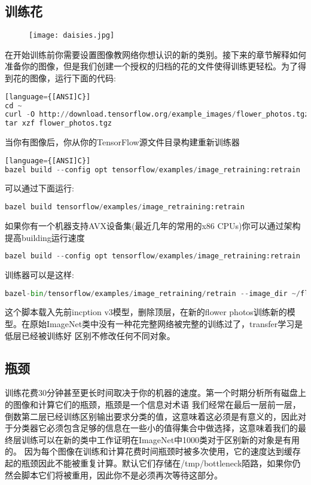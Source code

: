 \subsection{训练花}
\begin{center}
\begin{figure}
\texttt{[image: daisies.jpg]}
\end{figure}
\end{center}
在开始训练前你需要设置图像教网络你想认识的新的类别。接下来的章节解释如何准备你的图像，但是我们创建一个授权的归档的花的文件使得训练更轻松。为了得到花的图像，运行下面的代码:
\begin{lstlisting}[language=Python][language={[ANSI]C}]
cd ~
curl -O http://download.tensorflow.org/example_images/flower_photos.tgz
tar xzf flower_photos.tgz
\end{lstlisting}
当你有图像后，你从你的TensorFlow源文件目录构建重新训练器
\begin{lstlisting}[language=Python][language={[ANSI]C}]
bazel build --config opt tensorflow/examples/image_retraining:retrain
\end{lstlisting}
可以通过下面运行:
\begin{lstlisting}[language=Python]
bazel build tensorflow/examples/image_retraining:retrain
\end{lstlisting}
如果你有一个机器支持AVX设备集(最近几年的常用的x86 CPUs)你可以通过架构提高building运行速度
\begin{lstlisting}[language=Python]
bazel build --config opt tensorflow/examples/image_retraining:retrain
\end{lstlisting}
训练器可以是这样:
\begin{lstlisting}[language=Python]
bazel-bin/tensorflow/examples/image_retraining/retrain --image_dir ~/flower_photos
\end{lstlisting}
这个脚本载入先前incption v3模型，删除顶层，在新的flower photos训练新的模型。在原始ImageNet类中没有一种花完整网络被完整的训练过了，transfer学习是低层已经被训练好
区别不修改任何不同对象。
\subsection{瓶颈}
训练花费30分钟甚至更长时间取决于你的机器的速度。第一个时期分析所有磁盘上的图像和计算它们的瓶颈，瓶颈是一个信息对术语
我们经常在最后一层前一层，倒数第二层已经训练区别输出要求分类的值，这意味着这必须是有意义的，因此对于分类器它必须包含足够的信息在一些小的值得集合中做选择，这意味着我们的最终层训练可以在新的类中工作证明在ImageNet中1000类对于区别新的对象是有用的。
因为每个图像在训练和计算花费时间瓶颈时被多次使用，它的速度达到缓存起的瓶颈因此不能被重复计算。默认它们存储在/tmp/bottleneck陌路，如果你仍然会脚本它们将被重用，因此你不是必须再次等待这部分。
